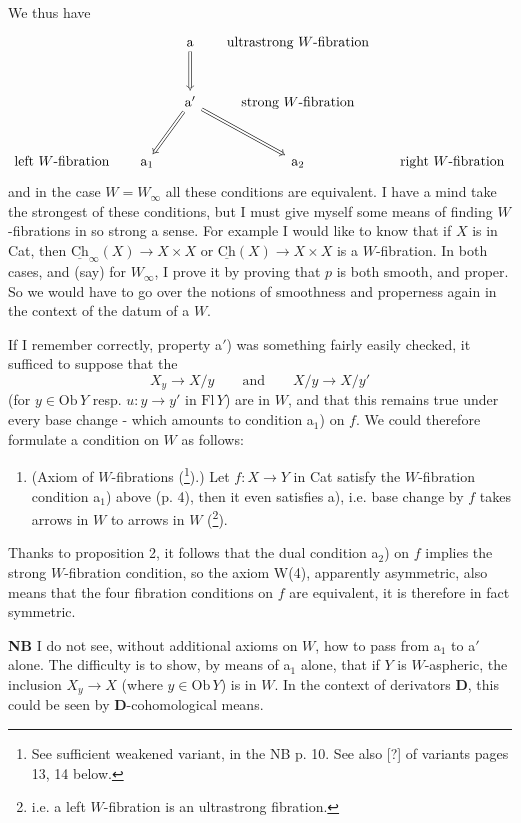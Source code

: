 \documentclass[11pt]{article}
\newcommand{\printedpage}[1]{\marginpar{\footnotesize p.~#1}}
\newcommand{\msp}[1]{\marginpar{\footnotesize [#1]}}
\newcommand{\Ch}{\underline{\mathrm{Ch}}}
\begin{document}
We thus have
\[
\begin{tikzcd}[row sep=large, column sep=1.4em]
 & & \mathrm{a} \arrow[d, Rightarrow] & \text{ultrastrong $W$-fibration} & \\
 & & \mathrm{a}' \arrow[dl, Rightarrow] \arrow[dr, Rightarrow] & \text{strong $W$-fibration} & \\
\text{left $W$-fibration} & \mathrm{a}_1 & & \mathrm{a}_2 & \text{right $W$-fibration}
\end{tikzcd}
\]
\printedpage{5}
and in the case $W = W_\infty$ all these conditions are equivalent. I have a mind take the strongest of these conditions, but I must give myself some means of finding $W$-fibrations in so strong a sense. For example I would like to know that if $X$
\msp{page 5}
is in Cat, then $\Ch_\infty(X) \longrightarrow X \times X$ or $\Ch(X) \longrightarrow X \times X$ is a $W$-fibration. In both cases, and (say) for $W_\infty$, I prove it by proving that $p$ is both smooth, and proper. So we would have to go over the notions of smoothness and properness again in the context of the datum of a $W$.

If I remember correctly, property a$'$) was something fairly easily checked, it sufficed to suppose that the
\[ X_y \longrightarrow X/y \qquad \text{and} \qquad X/y \longrightarrow X/y' \]
(for $y \in \mathrm{Ob}\,Y$ resp. $u : y \longrightarrow y'$ in $\mathrm{Fl}\,Y$) are in $W$, and that this remains true under every base change - which amounts to condition a$_1$) on $f$. We could therefore formulate a condition on $W$ as follows:

\begin{enumerate}[leftmargin=*]
\item[\textbf{W(4)}] (Axiom of $W$-fibrations (\footnote[6]{See sufficient weakened variant, in the NB p. 10. See also [?] of variants pages 13, 14 below.}).) Let $f : X \longrightarrow Y$ in Cat satisfy the $W$-fibration condition a$_1$) above (p. 4), then it even satisfies a), i.e. base change by $f$ takes arrows in $W$ to arrows in $W$ (\footnote[7]{i.e. a left $W$-fibration is an ultrastrong fibration.}).
\end{enumerate}

Thanks to proposition 2, it follows that the dual condition a$_2$) on $f$ implies the strong $W$-fibration condition, so the axiom W(4), apparently asymmetric, also means that the four fibration conditions on $f$ are equivalent, it is therefore in fact symmetric.

\textbf{NB} I do not see, without additional axioms on $W$, how to pass from a$_1$ to a$'$ alone. The difficulty is to show, by means of a$_1$ alone, that if $Y$ is $W$-aspheric, the inclusion $X_y \longrightarrow X$ (where $y \in \mathrm{Ob}\,Y$) is in $W$. In the context of derivators \textbf{D}, this could be seen by \textbf{D}-cohomological means.
\end{document}

